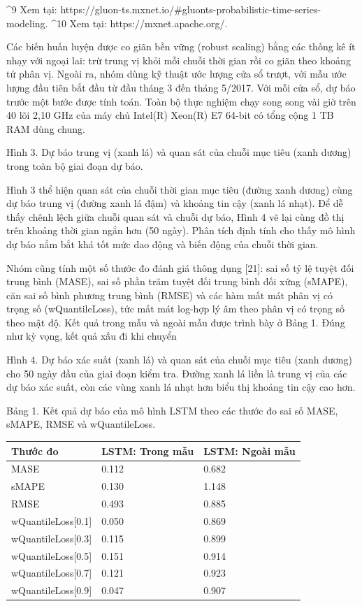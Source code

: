 \^{}9 Xem tại: https://gluon-ts.mxnet.io/\#gluonts-probabilistic-time-series-modeling. \^{}10 Xem tại: https://mxnet.apache.org/.

Các biến huấn luyện được co giãn bền vững (robust scaling) bằng các thống kê ít nhạy với ngoại lai: trừ trung vị khỏi mỗi chuỗi thời gian rồi co giãn theo khoảng tứ phân vị. Ngoài ra, nhóm dùng kỹ thuật ước lượng cửa sổ trượt, với mẫu ước lượng đầu tiên bắt đầu từ đầu tháng 3 đến tháng 5/2017. Với mỗi cửa sổ, dự báo trước một bước được tính toán. Toàn bộ thực nghiệm chạy song song vài giờ trên 40 lõi 2,10 GHz của máy chủ Intel(R) Xeon(R) E7 64-bit có tổng cộng 1 TB RAM dùng chung.

Hình 3. Dự báo trung vị (xanh lá) và quan sát của chuỗi mục tiêu (xanh dương) trong toàn bộ giai đoạn dự báo.

Hình 3 thể hiện quan sát của chuỗi thời gian mục tiêu (đường xanh dương) cùng dự báo trung vị (đường xanh lá đậm) và khoảng tin cậy (xanh lá nhạt). Để dễ thấy chênh lệch giữa chuỗi quan sát và chuỗi dự báo, Hình 4 vẽ lại cùng đồ thị trên khoảng thời gian ngắn hơn (50 ngày). Phân tích định tính cho thấy mô hình dự báo nắm bắt khá tốt mức dao động và biến động của chuỗi thời gian.

Nhóm cũng tính một số thước đo đánh giá thông dụng {[}21{]}: sai số tỷ lệ tuyệt đối trung bình (MASE), sai số phần trăm tuyệt đối trung bình đối xứng (sMAPE), căn sai số bình phương trung bình (RMSE) và các hàm mất mát phân vị có trọng số (wQuantileLoss), tức mất mát log-hợp lý âm theo phân vị có trọng số theo mật độ. Kết quả trong mẫu và ngoài mẫu được trình bày ở Bảng 1. Đúng như kỳ vọng, kết quả xấu đi khi chuyển

Hình 4. Dự báo xác suất (xanh lá) và quan sát của chuỗi mục tiêu (xanh dương) cho 50 ngày đầu của giai đoạn kiểm tra. Đường xanh lá liền là trung vị của các dự báo xác suất, còn các vùng xanh lá nhạt hơn biểu thị khoảng tin cậy cao hơn.

Bảng 1. Kết quả dự báo của mô hình LSTM theo các thước đo sai số MASE, sMAPE, RMSE và wQuantileLoss.

{\small
\begin{longtable}[]{@{}lll@{}}
\toprule\noalign{}
Thước đo & LSTM: Trong mẫu & LSTM: Ngoài mẫu \\
\midrule\noalign{}
\endhead
\bottomrule\noalign{}
\endlastfoot
MASE & 0.112 & 0.682 \\
sMAPE & 0.130 & 1.148 \\
RMSE & 0.493 & 0.885 \\
wQuantileLoss{[}0.1{]} & 0.050 & 0.869 \\
wQuantileLoss{[}0.3{]} & 0.115 & 0.899 \\
wQuantileLoss{[}0.5{]} & 0.151 & 0.914 \\
wQuantileLoss{[}0.7{]} & 0.121 & 0.923 \\
wQuantileLoss{[}0.9{]} & 0.047 & 0.907 \\
\end{longtable}
}

